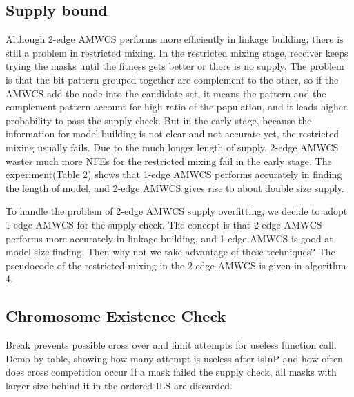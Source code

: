 \documentclass{sig-alternate-05-2015}
\begin{document}
\subsection{Supply bound}
Although 2-edge AMWCS performs more efficiently in linkage building, there is still a problem in restricted mixing. In 
the restricted mixing stage, receiver keeps trying the masks until the fitness gets better or there is no supply. The problem is that  the bit-pattern grouped together are complement to the other, so if the AMWCS add the node into the candidate set, it means the pattern and the complement pattern account for high ratio of the population, and it leads higher probability to pass the supply check. But in the early stage, because the information for model building is not clear and not accurate yet, the restricted mixing usually fails. Due to the much longer length of supply, 2-edge AMWCS wastes much more NFEs for the restricted mixing fail in the early stage. The experiment(Table 2) shows that  1-edge AMWCS performs accurately in finding the  length of model, and 2-edge AMWCS gives rise to about double size supply.

To handle the problem of 2-edge AMWCS supply overfitting, we decide to adopt 1-edge AMWCS for the supply check. The concept is that 2-edge AMWCS  performs more accurately in linkage building, and 1-edge AMWCS is good at model size finding. Then why not we take advantage of these techniques? The pseudocode of  the restricted mixing in the 2-edge AMWCS is given in algorithm 4.




\subsection{Chromosome Existence Check}
Break prevents possible cross over and limit attempts for useless function call. 
Demo by table, showing how many attempt is useless after isInP and how often does cross competition occur
If a mask failed the supply check, all masks with larger size behind it in the ordered ILS are discarded.
\end{document}
